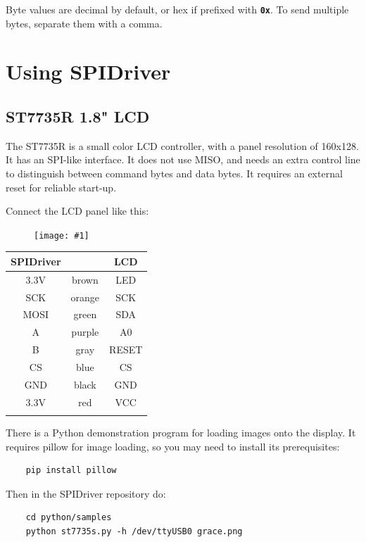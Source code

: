 \documentclass{article}
\newcommand{\pngw}[2]{
\begin{figure}[H]
\begin{center}
\texttt{[image: \#1]}
\end{center}
\end{figure}
}
\newcommand{\mach}[1]{\texttt{\textbf{#1}}}
\newcommand{\gap}{\vspace{10pt}}
\begin{document}
Byte values are decimal by default, or hex if prefixed with \mach{0x}.
To send multiple bytes, separate them with a comma.

\newpage
\section{Using SPIDriver}

\subsection{ST7735R 1.8" LCD}

The ST7735R is a small color LCD controller,
with a panel resolution of 160x128.
It has an SPI-like interface. It does not use MISO, and needs an
extra control line to distinguish between command bytes and data bytes.
It requires an external reset for reliable start-up.

Connect the LCD panel like this:

\pngw{img/spidriver/spidriver-lcd-1}{0.5}

\begin{center}
\gap\begin{tabular}{ccc}
\hline
SPIDriver&        & LCD     \\
\hline
3.3V     & brown  & LED     \\
SCK      & orange & SCK     \\
MOSI     & green  & SDA     \\
A        & purple & A0      \\
B        & gray   & RESET   \\
CS       & blue   & CS      \\
GND      & black  & GND     \\
3.3V     & red    & VCC     \\
\hline \\
\end{tabular}
\end{center}


There is a Python demonstration program for loading images onto the display.
It requires pillow for image loading, so you may need to install its prerequisites:

\begin{lstlisting}
    pip install pillow
\end{lstlisting}

Then in the SPIDriver repository do:

\begin{lstlisting}
    cd python/samples
    python st7735s.py -h /dev/ttyUSB0 grace.png
\end{lstlisting}
\end{document}

